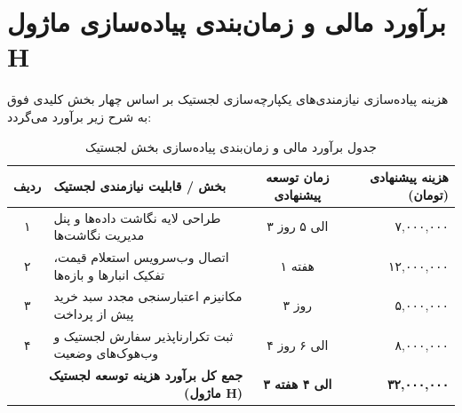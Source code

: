 \documentclass[11pt,a4paper]{article}
\begin{document}
\newpage
\section{برآورد مالی و زمان‌بندی پیاده‌سازی ماژول H}
هزینه پیاده‌سازی نیازمندی‌های یکپارچه‌سازی لجستیک بر اساس چهار بخش کلیدی فوق به شرح زیر برآورد می‌گردد:

\begin{table}[htbp]
\centering
\begin{tabularx}{\textwidth}{c X c r}
\toprule
\textbf{ردیف} & \textbf{بخش / قابلیت نیازمندی لجستیک} & \textbf{زمان توسعه پیشنهادی} & \textbf{هزینه پیشنهادی (تومان)} \\
\midrule
۱ & طراحی لایه نگاشت داده‌ها و پنل مدیریت نگاشت‌ها & ۳ الی ۵ روز & ۷,۰۰۰,۰۰۰ \\
۲ & اتصال وب‌سرویس استعلام قیمت، تفکیک انبارها و بازه‌ها & ۱ هفته & ۱۲,۰۰۰,۰۰۰ \\
۳ & مکانیزم اعتبارسنجی مجدد سبد خرید پیش از پرداخت & ۳ روز & ۵,۰۰۰,۰۰۰ \\
۴ & ثبت تکرارناپذیر سفارش لجستیک و وب‌هوک‌های وضعیت & ۴ الی ۶ روز & ۸,۰۰۰,۰۰۰ \\
\midrule
\multicolumn{2}{r}{\textbf{جمع کل برآورد هزینه توسعه لجستیک (ماژول H)}} & \textbf{۳ الی ۴ هفته} & \textbf{۳۲,۰۰۰,۰۰۰} \\
\bottomrule
\end{tabularx}
\caption{جدول برآورد مالی و زمان‌بندی پیاده‌سازی بخش لجستیک}
\end{table}
\end{document}
